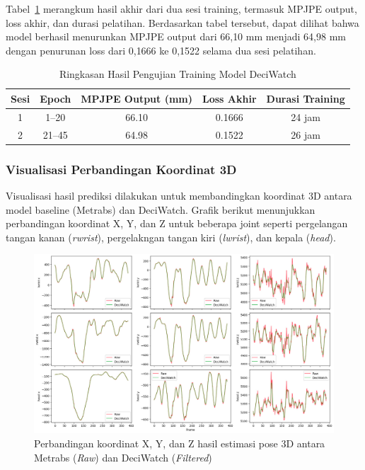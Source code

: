 Tabel~\ref{tab:hasil_training} merangkum hasil akhir dari dua sesi training, termasuk MPJPE output, loss akhir, dan durasi pelatihan. Berdasarkan tabel tersebut, dapat dilihat bahwa model berhasil menurunkan MPJPE output dari 66{,}10 mm menjadi 64{,}98 mm dengan penurunan loss dari 0{,}1666 ke 0{,}1522 selama dua sesi pelatihan.

\begin{table}[H]
\centering
\caption{Ringkasan Hasil Pengujian Training Model DeciWatch}
\label{tab:hasil_training}
\begin{tabular}{|c|c|c|c|c|}
\hline
\textbf{Sesi} & \textbf{Epoch} & \textbf{MPJPE Output (mm)} & \textbf{Loss Akhir} & \textbf{Durasi Training} \\ \hline
1 & 1--20  & 66.10 & 0.1666 & 24 jam \\ \hline
2 & 21--45 & 64.98 & 0.1522 & 26 jam \\ \hline
\end{tabular}
\end{table}




\subsubsection{Visualisasi Perbandingan Koordinat 3D}
Visualisasi hasil prediksi dilakukan untuk membandingkan koordinat 3D antara model baseline (Metrabs) dan DeciWatch. Grafik berikut menunjukkan perbandingan koordinat X, Y, dan Z untuk beberapa joint seperti pergelangan tangan kanan (\textit{rwrist}), pergelakngan tangan kiri (\textit{lwrist}), dan kepala (\textit{head}).

\begin{figure}[H]
    \centering
    \includegraphics[width=\textwidth]{images/koordinat_per_joint.png}
    \caption{Perbandingan koordinat X, Y, dan Z hasil estimasi pose 3D antara Metrabs (\textit{Raw}) dan DeciWatch (\textit{Filtered})}
    \label{fig:koordinat_joint}
\end{figure}

